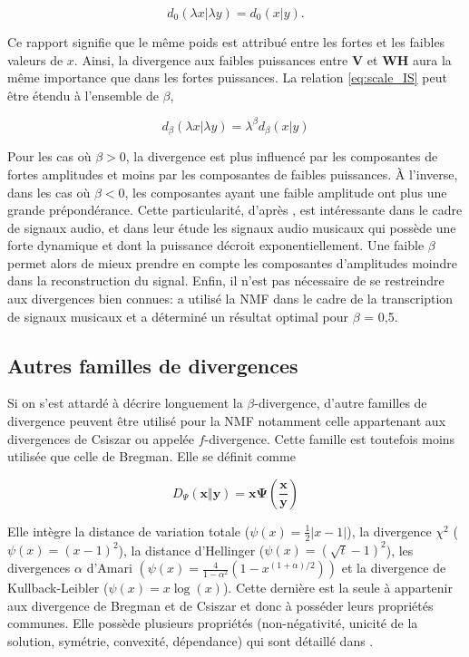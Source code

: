 \begin{equation}\label{eq:scale_IS}
d_{0}(\lambda x \vert \lambda y) = d_{0}(x \vert y).
\end{equation}

Ce rapport signifie que le même poids est attribué entre les fortes et les faibles valeurs de $x$. Ainsi, la divergence aux faibles puissances entre $\textbf{V}$ et $\textbf{WH}$ aura la même importance que dans les fortes puissances. La relation \ref{eq:scale_IS} peut être étendu à l'ensemble de $\beta$,  

\begin{equation}
d_{\beta}(\lambda x \vert \lambda y) = \lambda^{\beta}d_{\beta}(x \vert y)
\end{equation}


Pour les cas où $\beta > 0$, la divergence est plus influencé par les composantes de fortes amplitudes et moins par les composantes de faibles puissances. À l'inverse, dans les cas où $\beta < 0$, les composantes ayant une faible amplitude ont plus une grande prépondérance. Cette particularité, d'après \cite{fevotte_nonnegative_2009}, est intéressante dans le cadre de signaux audio, et dans leur étude les signaux audio musicaux qui possède une forte dynamique et dont la puissance décroit exponentiellement. Une faible $\beta$ permet alors de mieux prendre en compte les composantes d'amplitudes moindre dans la reconstruction du signal. Enfin, il n'est pas nécessaire de se restreindre aux divergences bien connues:  \cite{vincent2010adaptive} a utilisé la NMF dans le cadre de la transcription de signaux musicaux et a déterminé un résultat optimal pour $\beta$ = 0,5. \\

\subsection{Autres familles de divergences}
Si on s'est attardé à décrire longuement la $\beta$-divergence, d'autre familles de divergence peuvent être utilisé pour la NMF notamment celle appartenant aux divergences de Csiszar ou appelée $f$-divergence. Cette famille est toutefois moins utilisée que celle de Bregman. Elle se définit comme 

\begin{equation}
D_{\Psi} (\mathbf{x} \Vert\mathbf{y}) = \mathbf{x} \mathbf{\Psi} \left( \frac{\mathbf{x}}{\mathbf{y}}\right)
\end{equation}

Elle intègre la distance de variation totale ($\psi(x) = \frac{1}{2}\vert x-1 \vert $), la divergence $\chi^2$ ($\psi(x) = (x-1)^2$), la distance d'Hellinger ($\psi(x) = (\sqrt{t}-1)^2$), les divergences $\alpha$ d'Amari $\left(\psi(x) = \frac{4}{1-\alpha^2} \left(1-x^{(1+\alpha)/2} \right)\right)$ et la divergence de Kullback-Leibler ($\psi(x) = x\log (x)$). Cette dernière est la seule à appartenir aux divergence de Bregman et de Csiszar et donc à posséder leurs propriétés communes. Elle possède plusieurs propriétés (non-négativité, unicité de la solution, symétrie, convexité, dépendance) qui sont détaillé dans \cite{csiszar2004information}.

